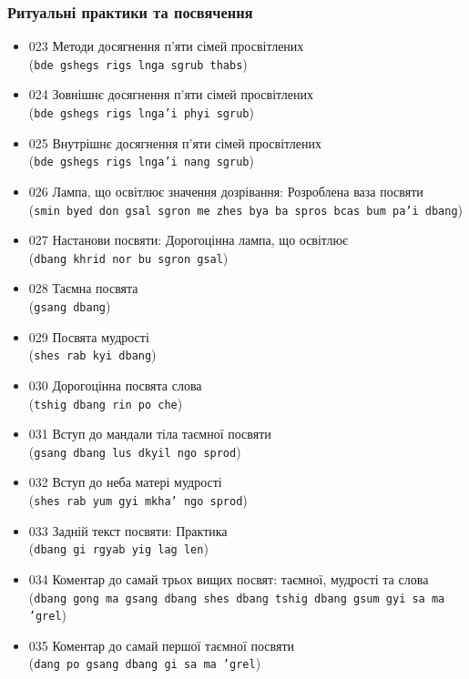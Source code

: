 \documentclass{article}
\begin{document}
\subsubsection{Ритуальні практики та посвячення}

\begingroup\raggedright
\begin{itemize}
\item 023 Методи досягнення п'яти сімей просвітлених \\ (\texttt{bde gshegs rigs lnga sgrub thabs})
\item 024 Зовнішнє досягнення п'яти сімей просвітлених \\ (\texttt{bde gshegs rigs lnga'i phyi sgrub})
\item 025 Внутрішнє досягнення п'яти сімей просвітлених \\ (\texttt{bde gshegs rigs lnga'i nang sgrub})
\item 026 Лампа, що освітлює значення дозрівання: Розроблена ваза посвяти \\ (\texttt{smin byed don gsal sgron me zhes bya ba spros bcas bum pa'i dbang})
\item 027 Настанови посвяти: Дорогоцінна лампа, що освітлює \\ (\texttt{dbang khrid nor bu sgron gsal})
\item 028 Таємна посвята \\ (\texttt{gsang dbang})
\item 029 Посвята мудрості \\ (\texttt{shes rab kyi dbang})
\item 030 Дорогоцінна посвята слова \\ (\texttt{tshig dbang rin po che})
\item 031 Вступ до мандали тіла таємної посвяти \\ (\texttt{gsang dbang lus dkyil ngo sprod})
\item 032 Вступ до неба матері мудрості \\ (\texttt{shes rab yum gyi mkha' ngo sprod})
\item 033 Задній текст посвяти: Практика \\ (\texttt{dbang gi rgyab yig lag len})
\item 034 Коментар до самай трьох вищих посвят: таємної, мудрості та слова \\ (\texttt{dbang gong ma gsang dbang shes dbang tshig dbang gsum gyi sa ma 'grel})
\item 035 Коментар до самай першої таємної посвяти \\ (\texttt{dang po gsang dbang gi sa ma 'grel})

\end{itemize}
\end{document}
